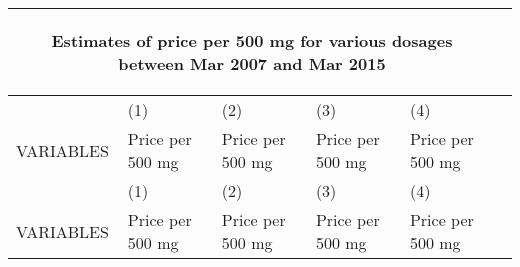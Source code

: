 \documentclass[12pt]{article}
\begin{document}
\begin{center}
\begin{longtable}{p{}p{}p{}p{}p{}p{}}
\multicolumn{5}{c}{\begin{large}Estimates of price per 500 mg for various dosages between Mar 2007 and Mar 2015 \label{I}\end{large}} \\ \hline
 & (1) & (2) & (3) & (4) \\
VARIABLES & Price per 500 mg & Price per 500 mg & Price per 500 mg & Price per 500 mg \\ \hline
\endfirsthead

\hline
 & (1) & (2) & (3) & (4) \\
VARIABLES & Price per 500 mg & Price per 500 mg & Price per 500 mg & Price per 500 mg \\ \hline
\endhead


\end{longtable}
\end{center}
\end{document}
